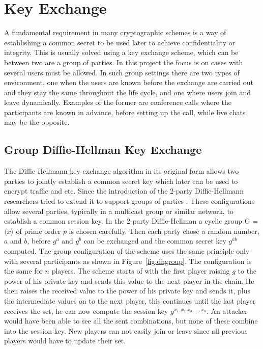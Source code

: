 \section{Key Exchange}\label{sec:key_exchange}
A fundamental requirement in many cryptographic schemes is a way of establishing a common secret to be used later to achieve confidentiality or integrity. This is usually solved using a key exchange scheme, which can be between two are a group of parties. In this project the focus is on cases with several users must be allowed. In such group settings there are two types of environment, one when the users are known before the exchange are carried out and they stay the same throughout the life cycle, and one where users join and leave dynamically. Examples of the former are conference calls where the participants are known in advance, before setting up the call, while live chats may be the opposite. 

\subsection{Group Diffie-Hellman Key Exchange}\label{subsec:DH}
The Diffie-Hellmann key exchange algorithm in its original form allows two parties to jointly establish a common secret key which later can be used to encrypt traffic and etc. Since the introduction of the 2-party Diffie-Hellmann researchers tried to extend it to support groups of parties \cite{steiner1996diffie, groupDH}. These configurations allow several parties, typically in a multicast group or similar network, to establish a common session key. In the 2-party Diffie-Hellman a cyclic group G =  $\langle x \rangle$ of prime order $p$ is chosen carefully. Then each party chose a random number, $a$ and $b$, before $g^a$ and $g^b$ can be exchanged and the common secret key $g^{ab}$ computed. The group configuration of the scheme uses the same principle only with several participants as shown in Figure~\ref{fig:dhgroup}. The configuration is the same for $n$ players. The scheme starts of with the first player raising $g$ to the power of his private key and sends this value to the next player in the chain. He then raises the received value to the power of his private key and sends it, plus the intermediate values on to the next player, this continues until the last player receives the set, he can now compute the session key $g^{x_1,x_2.x_3,...,x_n}$. An attacker would have been able to see all the sent combinations, but none of these combine into the session key. New players can not easily join or leave since all previous players would have to update their set. 

